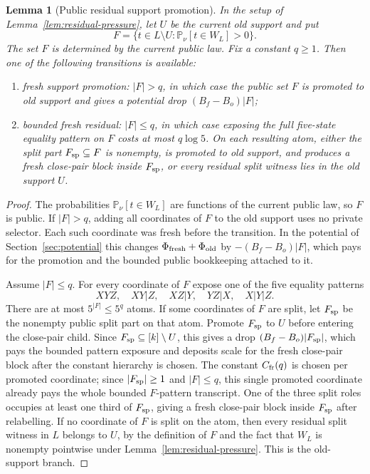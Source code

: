 \documentclass[11pt]{article}
\newtheorem{lemma}[theorem]{Lemma}
\newcommand{\Prb}{\mathbb P}
\begin{document}
\begin{lemma}[Public residual support promotion]
\label{lem:residual-support-promotion}
In the setup of Lemma~\ref{lem:residual-pressure}, let $U$ be the current old
support and put
\[
  F=\{t\in L\setminus U:\Prb_\nu[t\in W_L]>0\}.
\]
The set $F$ is determined by the current public law.  Fix a constant
$q\ge 1$.  Then one of the following transitions is available:
\begin{enumerate}[label=\textup{(\roman*)}]
\item fresh support promotion: $|F|>q$, in which case the public set $F$ is
promoted to old support and gives a potential drop $(B_f-B_o)|F|$;
\item bounded fresh residual: $|F|\le q$, in which case exposing the full
five-state equality pattern on $F$ costs at most $q\log 5$.  On each resulting
atom, either the split part $F_{\rm sp}\subseteq F$ is nonempty, is promoted to
old support, and produces a fresh close-pair block inside $F_{\rm sp}$, or
every residual split witness lies in the old support $U$.
\end{enumerate}
\end{lemma}

\begin{proof}
The probabilities $\Prb_\nu[t\in W_L]$ are functions of the current public
law, so $F$ is public.  If $|F|>q$, adding all coordinates of $F$ to the old
support uses no private selector.  Each such coordinate was fresh before the
transition.  In the potential of Section~\ref{sec:potential} this
changes $\Phi_{\rm fresh}+\Phi_{\rm old}$ by
$-(B_f-B_o)|F|$, which pays for the promotion and the bounded public
bookkeeping attached to it.

Assume $|F|\le q$.  For every coordinate of $F$ expose one of the five
equality patterns
\[
  XYZ,\quad XY|Z,\quad XZ|Y,\quad YZ|X,\quad X|Y|Z .
\]
There are at most $5^{|F|}\le 5^q$ atoms.  If some coordinates of $F$ are
split, let $F_{\rm sp}$ be the nonempty public split part on that atom.  Promote
	$F_{\rm sp}$ to $U$ before entering the close-pair child.  Since
	$F_{\rm sp}\subseteq [k]\setminus U$, this gives a drop
	$(B_f-B_o)|F_{\rm sp}|$, which pays the bounded pattern exposure and deposits
	scale for the fresh close-pair block after the constant hierarchy is chosen.
	The constant $C_{\rm fr}(q)$ is chosen per promoted coordinate; since
	$|F_{\rm sp}|\ge1$ and $|F|\le q$, this single promoted coordinate already
	pays the whole bounded $F$-pattern transcript.
One of the three split roles occupies at least one third of $F_{\rm sp}$,
giving a fresh close-pair block inside $F_{\rm sp}$ after relabelling.
If no coordinate of $F$ is split on the atom, then every residual split
witness in $L$ belongs to $U$, by the definition of $F$ and the fact that
$W_L$ is nonempty pointwise under Lemma~\ref{lem:residual-pressure}.  This is
the old-support branch.
\end{proof}
\end{document}
